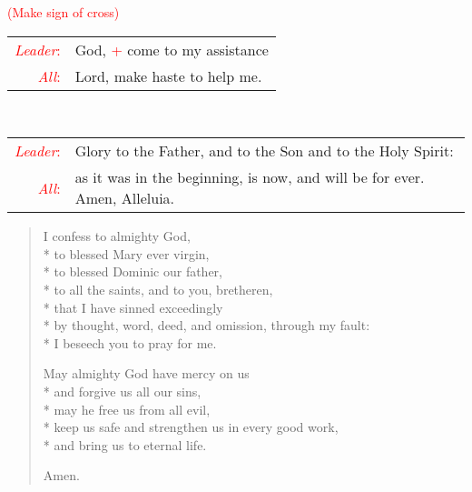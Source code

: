 \documentclass[letterpaper,12pt]{extarticle}
\newcommand{\side}[1]{\flagverse{\textcolor{red}{\textit{#1}}:}}
\newcommand{\sidestar}[1]{\textcolor{red}{\textit{#1}:}}
\newcommand{\rednote}[1]{\textcolor{red}{#1}}
\newcommand{\intercession}[2]{
	\begin{tabular}[h]{r p{4.25in}}
		\sidestar{Leader} & #1 \\
		\sidestar{All} & #2
	\end{tabular}}
\begin{document}
\vspace{-4.0\baselineskip}
\hspace{\leftmargini}\rednote{(Make sign of cross)}\\
\intercession{God, \rednote{+} come to my assistance}
{Lord, make haste to help me.}\\
\intercession{Glory to the Father, and to the Son and to the Holy Spirit:}
{as it was in the beginning, is now, and will be for ever. Amen, Alleluia.}

\begin{verse}
	\side{All} I confess to almighty God, \\*
	to blessed Mary ever virgin, \\*
	to blessed Dominic our father, \\*
	to all the saints, and to you, bretheren, \\*
	that I have sinned exceedingly \\*
	by thought, word, deed, and omission, through my fault: \\*
	I beseech you to pray for me.

	\side{Leader} May almighty God have mercy on us \\*
	and forgive us all our sins, \\*
	may he free us from all evil, \\*
	keep us safe and strengthen us in every good work, \\*
	and bring us to eternal life.

	\side{All} Amen.
\end{verse}
\end{document}
